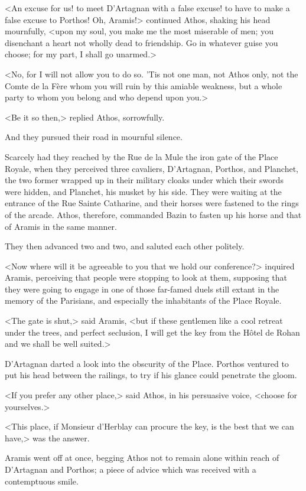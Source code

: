 <An excuse for us! to meet D'Artagnan with a false excuse! to have to make a false excuse to Porthos! Oh, Aramis!> continued Athos, shaking his head mournfully, <upon my soul, you make me the most miserable of men; you disenchant a heart not wholly dead to friendship. Go in whatever guise you choose; for my part, I shall go unarmed.>

<No, for I will not allow you to do so. 'Tis not one man, not Athos only, not the Comte de la Fère whom you will ruin by this amiable weakness, but a whole party to whom you belong and who depend upon you.>

<Be it so then,> replied Athos, sorrowfully.

And they pursued their road in mournful silence.

Scarcely had they reached by the Rue de la Mule the iron gate of the Place Royale, when they perceived three cavaliers, D'Artagnan, Porthos, and Planchet, the two former wrapped up in their military cloaks under which their swords were hidden, and Planchet, his musket by his side. They were waiting at the entrance of the Rue Sainte Catharine, and their horses were fastened to the rings of the arcade. Athos, therefore, commanded Bazin to fasten up his horse and that of Aramis in the same manner.

They then advanced two and two, and saluted each other politely.

<Now where will it be agreeable to you that we hold our conference?> inquired Aramis, perceiving that people were stopping to look at them, supposing that they were going to engage in one of those far-famed duels still extant in the memory of the Parisians, and especially the inhabitants of the Place Royale.

<The gate is shut,> said Aramis, <but if these gentlemen like a cool retreat under the trees, and perfect seclusion, I will get the key from the Hôtel de Rohan and we shall be well suited.>

D'Artagnan darted a look into the obscurity of the Place. Porthos ventured to put his head between the railings, to try if his glance could penetrate the gloom.

<If you prefer any other place,> said Athos, in his persuasive voice, <choose for yourselves.>

<This place, if Monsieur d'Herblay can procure the key, is the best that we can have,> was the answer.

Aramis went off at once, begging Athos not to remain alone within reach of D'Artagnan and Porthos; a piece of advice which was received with a contemptuous smile.

